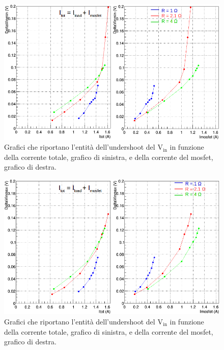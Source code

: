 \begin{figure}
\centering
\includegraphics[scale=.45]{Immagini/VinUnd}
\caption{Grafici che riportano l'entità dell'undershoot del $\mathrm{V_{in}}$ in funzione della corrente totale, grafico di sinistra, e della corrente del mosfet, grafico di destra.}
\label{VinUnd}
\end{figure}
\begin{figure}
\centering
\includegraphics[scale=.45]{Immagini/VinOver}
\caption{Grafici che riportano l'entità dell'undershoot del $\mathrm{V_{in}}$ in funzione della corrente totale, grafico di sinistra, e della corrente del mosfet, grafico di destra.}
\label{VinOver}
\end{figure}

